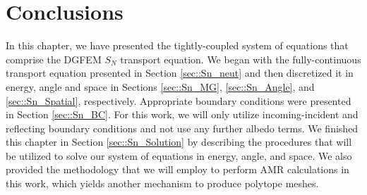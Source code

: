 \section{Conclusions}
\label{sec::Sn_Conclusions}

In this chapter, we have presented the tightly-coupled system of equations that comprise the DGFEM $S_N$ transport equation. We began with the fully-continuous transport equation presented in Section \ref{sec::Sn_neut} and then discretized it in energy, angle and space in Sections \ref{sec::Sn_MG}, \ref{sec::Sn_Angle}, and \ref{sec::Sn_Spatial}, respectively. Appropriate boundary conditions were presented in Section \ref{sec::Sn_BC}. For this work, we will only utilize incoming-incident and reflecting boundary conditions and not use any further albedo terms. We finished this chapter in Section \ref{sec::Sn_Solution} by describing the procedures that will be utilized to solve our system of equations in energy, angle, and space. We also provided the methodology that we will employ to perform AMR calculations in this work, which yields another mechanism to produce polytope meshes.

